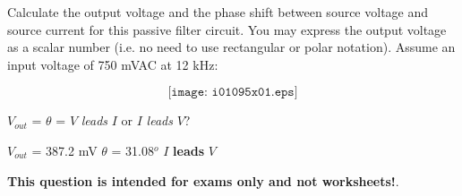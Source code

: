

Calculate the output voltage and the phase shift between source voltage and source current for this passive filter circuit.  You may express the output voltage as a scalar number (i.e. no need to use rectangular or polar notation).  Assume an input voltage of 750 mVAC at 12 kHz:

$$\texttt{[image: i01095x01.eps]}$$

$V_{out}$ = \hskip 100pt $\theta$ = \hskip 100pt $V$ {\it leads} $I$ or $I$ {\it leads} $V$?

\vskip 10pt







$V_{out}$ = 387.2 mV \hskip 100pt $\theta$ = 31.08$^{o}$ \hskip 100pt $I$ {\bf leads} $V$







{\bf This question is intended for exams only and not worksheets!}.



